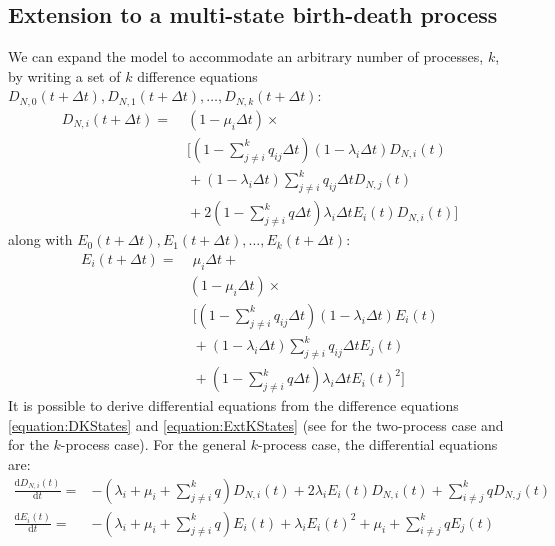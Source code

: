 \subsection{Extension to a multi-state birth-death process}
We can expand the \BiSSE model to accommodate an arbitrary number of processes, $k$, by writing a set of $k$ difference equations $D_{N,0}(t+\Delta t), D_{N,1}(t+\Delta t), \ldots, D_{N,k}(t+\Delta t)$:
\begin{align}
		D_{N,i}(t + \Delta t) = & \;(1 - \mu_i\Delta t) \times \label{equation:DKStates} \\
		& \;[  (1 - \sum\limits_{j \neq i}^k q_{ij}\Delta t)(1 - \lambda_i\Delta t)D_{N,i}(t) \nonumber\\
		& \; + (1 - \lambda_i\Delta t)  \sum\limits_{j \neq i}^k q_{ij}\Delta t D_{N,j}(t) \nonumber\\
		& \; + 2 (1 - \sum\limits_{j \neq i}^k q\Delta t) \lambda_i\Delta t E_i(t)D_{N,i}(t)] \nonumber
\end{align}
along with $E_0(t+\Delta t), E_1(t+\Delta t), \ldots, E_k(t+\Delta t)$:
\begin{align}
	E_i(t + \Delta t) = &\; \mu_i\Delta t +	\label{equation:ExtKStates}	\\
				    	    & (1 - \mu_i\Delta t) \times \nonumber\\
					    & \;[(1-\sum\limits_{j \neq i}^k q_{ij}\Delta t)(1-\lambda_i\Delta t)E_i(t) \nonumber\\
					    & \;+ (1-\lambda_i\Delta t) \sum\limits_{j \neq i}^k q_{ij}\Delta t E_j(t) \nonumber\\
					    & \;+ (1 - \sum\limits_{j \neq i}^k q\Delta t) \lambda_i\Delta t E_i(t)^2] \nonumber
\end{align}
It is possible to derive differential equations from the difference equations \ref{equation:DKStates} and \ref{equation:ExtKStates} (see \cite{Maddison2007} for the two-process case and \cite{FitzJohn2012} for the $k$-process case).
For the general $k$-process case, the differential equations are:
\begin{align*}
	\frac{\mathrm{d}D_{N,i}(t)}{\mathrm{d}t} = & - \left(\lambda_i + \mu_i + \sum\limits_{j \neq i}^k q\right)D_{N,i}(t) + 2\lambda_iE_i(t)D_{N,i}(t) + \sum\limits_{i \neq j}^k q D_{N,j}(t) \\
   	\frac{\mathrm{d}E_i(t)}{\mathrm{d}t} = & - \left(\lambda_i + \mu_i + \sum\limits_{j \neq i}^k q \right)E_i(t) + \lambda_iE_i(t)^2 + \mu_i + \sum\limits_{i \neq j}^k q E_j(t)
\end{align*}

